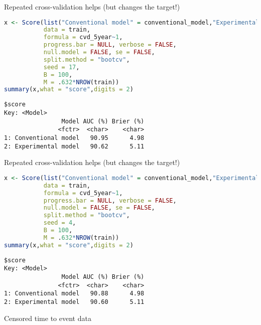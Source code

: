 \documentclass{beamer}\usepackage{listings}
\begin{document}
\begin{frame}[label={sec:org7716257},fragile]{Repeated cross-validation helps (but changes the target!)}
 \begin{lstlisting}[language=r,numbers=none,otherkeywords={seed,train,method,B,M}, deletekeywords={model,family,se,null,data,formula}]
x <- Score(list("Conventional model" = conventional_model,"Experimental model" = experimental_model),
           data = train,
           formula = cvd_5year~1,
           progress.bar = NULL, verbose = FALSE,
           null.model = FALSE, se = FALSE,
           split.method = "bootcv",
           seed = 17,
           B = 100,
           M = .632*NROW(train))
summary(x,what = "score",digits = 2)
\end{lstlisting}

\label{}
\begin{verbatim}
$score
Key: <Model>
                Model AUC (%) Brier (%)
               <fctr>  <char>    <char>
1: Conventional model   90.95      4.98
2: Experimental model   90.62      5.11
\end{verbatim}
\end{frame}
\begin{frame}[label={sec:org211b5d8},fragile]{Repeated cross-validation helps (but changes the target!)}
 \begin{lstlisting}[language=r,numbers=none,otherkeywords={seed,train,method,B,M}, deletekeywords={model,family,se,null,data,formula}]
x <- Score(list("Conventional model" = conventional_model,"Experimental model" = experimental_model),
           data = train,
           formula = cvd_5year~1,
           progress.bar = NULL, verbose = FALSE,
           null.model = FALSE, se = FALSE,
           split.method = "bootcv",
           seed = 4,
           B = 100,
           M = .632*NROW(train))
summary(x,what = "score",digits = 2)
\end{lstlisting}

\label{}
\begin{verbatim}
$score
Key: <Model>
                Model AUC (%) Brier (%)
               <fctr>  <char>    <char>
1: Conventional model   90.88      4.98
2: Experimental model   90.60      5.11
\end{verbatim}
\end{frame}
\begin{frame}[label={sec:org3e741de}]{}
\huge \color{white}
Censored time to event data
\end{frame}
\end{document}
